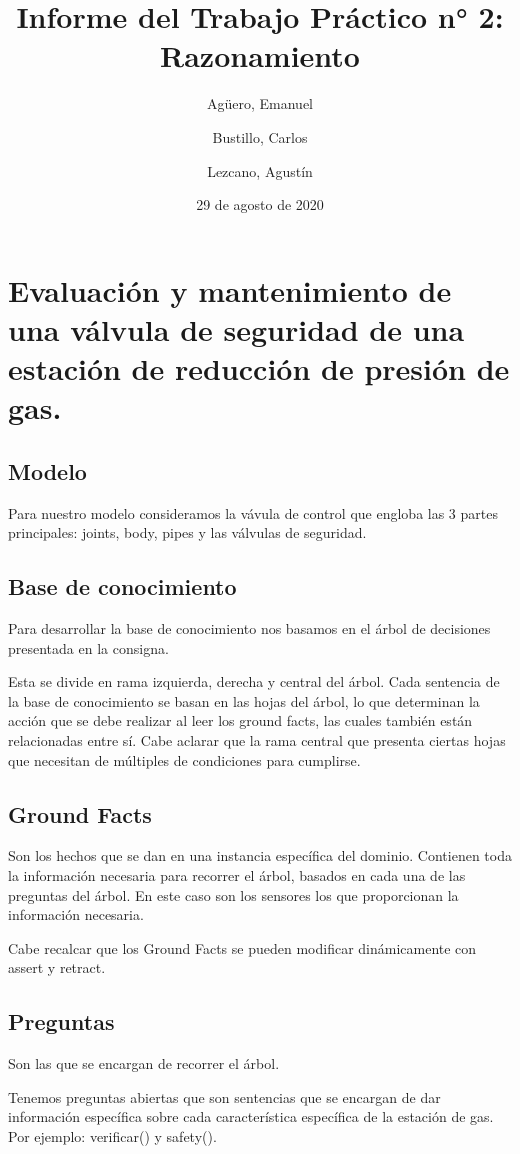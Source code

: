 \documentclass{article}
\title{Informe del Trabajo Práctico n° 2: Razonamiento}
\author{Agüero, Emanuel\\
\and
Bustillo, Carlos\\
\and
Lezcano, Agustín\\
}
\date{29 de agosto de 2020}
\begin{document}
\maketitle

\section{Evaluación y mantenimiento de una válvula de seguridad de una estación de reducción de presión de gas.}

\subsection{Modelo}
    Para nuestro modelo consideramos la vávula de control que engloba las 3 partes principales: joints, body, pipes y las válvulas de seguridad.

\subsection{Base de conocimiento}
    Para desarrollar la base de conocimiento nos basamos en el árbol de decisiones presentada en la consigna.
    
    Esta se divide en rama izquierda, derecha y central del árbol. Cada sentencia de la base de conocimiento se basan en las hojas del árbol, lo que determinan la acción que se debe realizar al leer los ground facts, las cuales también están relacionadas entre sí. Cabe aclarar que la rama central que presenta ciertas hojas que necesitan de múltiples de condiciones para cumplirse. 

\subsection{Ground Facts}
    Son los hechos que se dan en una instancia específica del dominio. Contienen toda la información necesaria para recorrer el árbol, basados en cada una de las preguntas del árbol. En este caso son los sensores los que proporcionan la información necesaria. 
    
    Cabe recalcar que los Ground Facts se pueden modificar dinámicamente con assert y retract.

\subsection{Preguntas}
    Son las que se encargan de recorrer el árbol. 
    
    Tenemos preguntas abiertas que son sentencias que se encargan de dar información específica sobre cada característica específica de la estación de gas. Por ejemplo: verificar() y safety().
    
\end{document}
